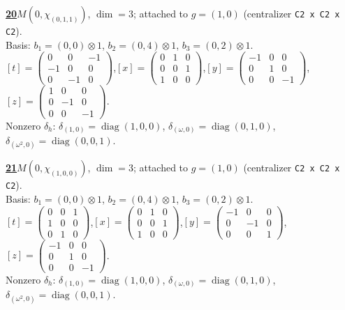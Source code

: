 \begin{samepage}\noindent\textbf{\underline{20}}\quad $M(0,\chi_{(0,1,1)})$, $\dim=3$; attached to $g=(1,0)$ (centralizer \texttt{C2 x C2 x C2}).\\
Basis: $b_{1}=(0,0)\otimes 1$, $b_{2}=(0,4)\otimes 1$, $b_{3}=(0,2)\otimes 1$.\\
$[t]=\left(\begin{smallmatrix} 0 & 0 & -1 \\ -1 & 0 & 0 \\ 0 & -1 & 0 \end{smallmatrix}\right)$,\quad $[x]=\left(\begin{smallmatrix} 0 & 1 & 0 \\ 0 & 0 & 1 \\ 1 & 0 & 0 \end{smallmatrix}\right)$,\quad $[y]=\left(\begin{smallmatrix} -1 & 0 & 0 \\ 0 & 1 & 0 \\ 0 & 0 & -1 \end{smallmatrix}\right)$,\quad $[z]=\left(\begin{smallmatrix} 1 & 0 & 0 \\ 0 & -1 & 0 \\ 0 & 0 & -1 \end{smallmatrix}\right)$.\\
Nonzero $\delta_h$: $\delta_{(1,0)}=\operatorname{diag}(1,0,0)$, $\delta_{(\omega,0)}=\operatorname{diag}(0,1,0)$, $\delta_{(\omega^2,0)}=\operatorname{diag}(0,0,1)$.\end{samepage}
\medskip

\begin{samepage}\noindent\textbf{\underline{21}}\quad $M(0,\chi_{(1,0,0)})$, $\dim=3$; attached to $g=(1,0)$ (centralizer \texttt{C2 x C2 x C2}).\\
Basis: $b_{1}=(0,0)\otimes 1$, $b_{2}=(0,4)\otimes 1$, $b_{3}=(0,2)\otimes 1$.\\
$[t]=\left(\begin{smallmatrix} 0 & 0 & 1 \\ 1 & 0 & 0 \\ 0 & 1 & 0 \end{smallmatrix}\right)$,\quad $[x]=\left(\begin{smallmatrix} 0 & 1 & 0 \\ 0 & 0 & 1 \\ 1 & 0 & 0 \end{smallmatrix}\right)$,\quad $[y]=\left(\begin{smallmatrix} -1 & 0 & 0 \\ 0 & -1 & 0 \\ 0 & 0 & 1 \end{smallmatrix}\right)$,\quad $[z]=\left(\begin{smallmatrix} -1 & 0 & 0 \\ 0 & 1 & 0 \\ 0 & 0 & -1 \end{smallmatrix}\right)$.\\
Nonzero $\delta_h$: $\delta_{(1,0)}=\operatorname{diag}(1,0,0)$, $\delta_{(\omega,0)}=\operatorname{diag}(0,1,0)$, $\delta_{(\omega^2,0)}=\operatorname{diag}(0,0,1)$.\end{samepage}
\medskip

